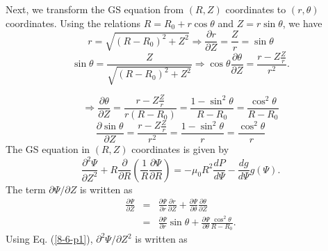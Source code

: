 \documentclass{llncs}
\begin{document}
Next, we transform the GS equation from $(R, Z)$ coordinates to $(r, \theta)$
coordinates. Using the relations $R = R_0 + r \cos \theta$ and $Z = r \sin
\theta$, we have
\begin{equation}
  r = \sqrt{(R - R_0)^2 + Z^2} \Rightarrow \frac{\partial r}{\partial Z} =
  \frac{Z}{r} = \sin \theta
\end{equation}
\begin{equation}
  \sin \theta = \frac{Z}{\sqrt{(R - R_0)^2 + Z^2}} \Rightarrow \cos \theta
  \frac{\partial \theta}{\partial Z} = \frac{r - Z \frac{Z}{r}}{r^2} .
\end{equation}

\begin{equation}
  \Rightarrow \frac{\partial \theta}{\partial Z} = \frac{r - Z \frac{Z}{r}}{r
  (R - R_0)} = \frac{1 - \sin^2 \theta}{R - R_0} = \frac{\cos^2 \theta}{R -
  R_0}
\end{equation}
\begin{equation}
  \frac{\partial \sin \theta}{\partial Z} = \frac{r - Z \frac{Z}{r}}{r^2} =
  \frac{1 - \sin^2 \theta}{r} = \frac{\cos^2 \theta}{r}
\end{equation}
The GS equation in $(R, Z)$ coordinates is given by
\begin{equation}
  \frac{\partial^2 \Psi}{\partial Z^2} + R \frac{\partial}{\partial R} \left(
  \frac{1}{R} \frac{\partial \Psi}{\partial R} \right) = - \mu_0 R^2 \frac{d
  P}{d \Psi} - \frac{d g}{d \Psi} g (\Psi) .
\end{equation}
The term $\partial \Psi / \partial Z$ is written as
\begin{eqnarray}
  \frac{\partial \Psi}{\partial Z} & = & \frac{\partial \Psi}{\partial r} 
  \frac{\partial r}{\partial Z} + \frac{\partial \Psi}{\partial \theta} 
  \frac{\partial \theta}{\partial Z} \nonumber\\
  & = & \frac{\partial \Psi}{\partial r} \sin \theta + \frac{\partial
  \Psi}{\partial \theta}  \frac{\cos^2 \theta}{R - R_0} .  \label{8-6-p1}
\end{eqnarray}
Using Eq. (\ref{8-6-p1}), $\partial^2 \Psi / \partial Z^2$ is written as
\end{document}
